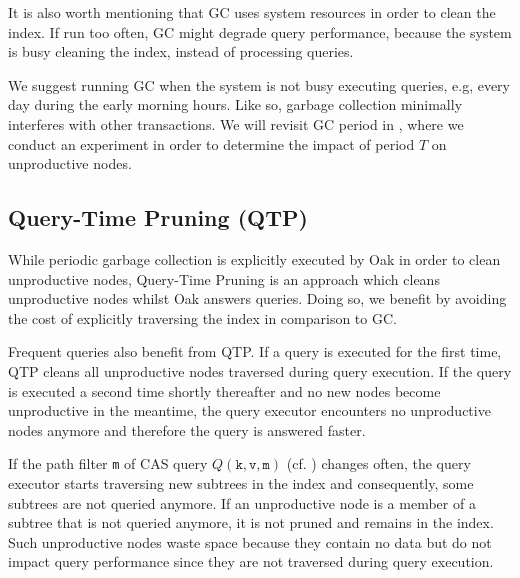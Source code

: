 \documentclass[abstracton,12pt]{scrartcl}
\theoremstyle{definition}
\begin{document}
It is also worth mentioning that GC uses system resources in order to clean the
index. If run too often, GC might degrade query performance, because the system
is busy cleaning the index, instead of processing queries.

We suggest running GC when the system is not busy executing queries, e.g, every
day during the 
early morning hours. Like so, garbage collection minimally interferes with other
transactions. We will revisit GC period in , where we
conduct an experiment in order to determine the impact of period $T$ on
unproductive nodes. 

\subsection{Query-Time Pruning (QTP)}

While periodic garbage collection is explicitly executed by Oak in order to
clean unproductive nodes, Query-Time Pruning is an approach which cleans
unproductive nodes whilst Oak answers queries. Doing so, we benefit by
avoiding the cost of explicitly traversing the index in comparison to GC.  

Frequent queries also benefit from QTP. If a query is executed for the first
time, QTP cleans all unproductive nodes traversed during query execution.
If the query is executed a second time shortly thereafter and  no new nodes
become unproductive in the meantime, the query executor encounters no
unproductive nodes anymore and therefore the query is answered faster.

If the path filter \texttt{m} of CAS query $Q(\texttt{k},\texttt{v},\texttt{m})$
(cf. ) changes often, 
the query executor starts traversing new subtrees in the index
and consequently, some subtrees are not queried anymore. If an unproductive
node is a member of a subtree that is not queried anymore, it is not pruned and
remains in the index.
Such unproductive nodes waste space because they contain no data but do not
impact query performance since they are not traversed during query execution.

\end{document}
